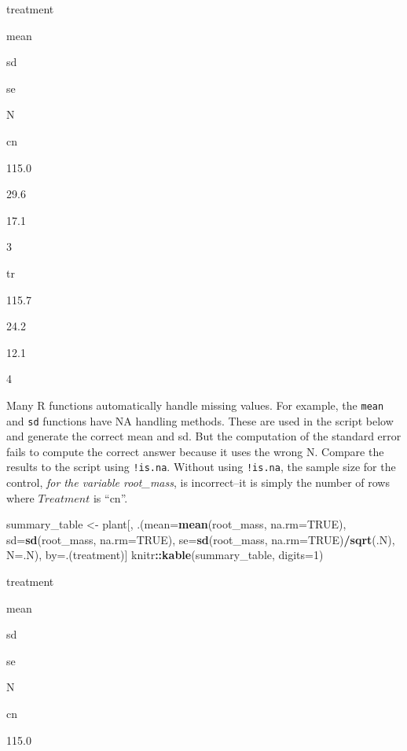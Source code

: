 \documentclass[]{book}
\newenvironment{Shaded}{\begin{snugshade}}{\end{snugshade}}
\newcommand{\KeywordTok}[1]{\textcolor[rgb]{0.13,0.29,0.53}{\textbf{#1}}}
\newcommand{\DataTypeTok}[1]{\textcolor[rgb]{0.13,0.29,0.53}{#1}}
\newcommand{\DecValTok}[1]{\textcolor[rgb]{0.00,0.00,0.81}{#1}}
\newcommand{\StringTok}[1]{\textcolor[rgb]{0.31,0.60,0.02}{#1}}
\newcommand{\OtherTok}[1]{\textcolor[rgb]{0.56,0.35,0.01}{#1}}
\newcommand{\OperatorTok}[1]{\textcolor[rgb]{0.81,0.36,0.00}{\textbf{#1}}}
\newcommand{\NormalTok}[1]{#1}
\begin{document}
treatment

mean

sd

se

N

cn

115.0

29.6

17.1

3

tr

115.7

24.2

12.1

4

Many R functions automatically handle missing values. For example, the
\texttt{mean} and \texttt{sd} functions have NA handling methods. These
are used in the script below and generate the correct mean and sd. But
the computation of the standard error fails to compute the correct
answer because it uses the wrong N. Compare the results to the script
using \texttt{!is.na}. Without using \texttt{!is.na}, the sample size
for the control, \emph{for the variable root\_mass}, is incorrect--it is
simply the number of rows where \(Treatment\) is ``cn''.

\begin{Shaded}
\begin{Highlighting}[]
\NormalTok{summary_table <-}\StringTok{ }\NormalTok{plant[,}
\NormalTok{                       .(}\DataTypeTok{mean=}\KeywordTok{mean}\NormalTok{(root_mass, }\DataTypeTok{na.rm=}\OtherTok{TRUE}\NormalTok{),}
                         \DataTypeTok{sd=}\KeywordTok{sd}\NormalTok{(root_mass, }\DataTypeTok{na.rm=}\OtherTok{TRUE}\NormalTok{),}
                         \DataTypeTok{se=}\KeywordTok{sd}\NormalTok{(root_mass, }\DataTypeTok{na.rm=}\OtherTok{TRUE}\NormalTok{)}\OperatorTok{/}\KeywordTok{sqrt}\NormalTok{(.N),}
                         \DataTypeTok{N=}\NormalTok{.N), }
\NormalTok{                       by=.(treatment)]}
\NormalTok{knitr}\OperatorTok{::}\KeywordTok{kable}\NormalTok{(summary_table, }\DataTypeTok{digits=}\DecValTok{1}\NormalTok{)}
\end{Highlighting}
\end{Shaded}

treatment

mean

sd

se

N

cn

115.0
\end{document}

